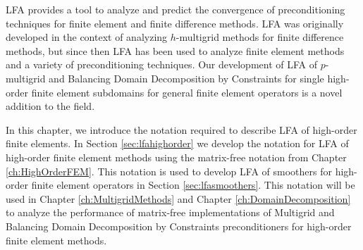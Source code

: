 LFA provides a tool to analyze and predict the convergence of preconditioning techniques for finite element and finite difference methods.
LFA \cite{brandt1977multi} was originally developed in the context of analyzing $h$-multigrid methods for finite difference methods, but since then LFA has been used to analyze finite element methods and a variety of preconditioning techniques.
Our development of LFA of $p$-multigrid and Balancing Domain Decomposition by Constraints for single high-order finite element subdomains for general finite element operators is a novel addition to the field.

In this chapter, we introduce the notation required to describe LFA of high-order finite elements.
In Section \ref{sec:lfahighorder} we develop the notation for LFA of high-order finite element methods using the matrix-free notation from Chapter \ref{ch:HighOrderFEM}.
This notation is used to develop LFA of smoothers for high-order finite element operators in Section \ref{sec:lfasmoothers}.
This notation will be used in Chapter \ref{ch:MultigridMethods} and Chapter \ref{ch:DomainDecomposition} to analyze the performance of matrix-free implementations of Multigrid and Balancing Domain Decomposition by Constraints preconditioners for high-order finite element methods.
